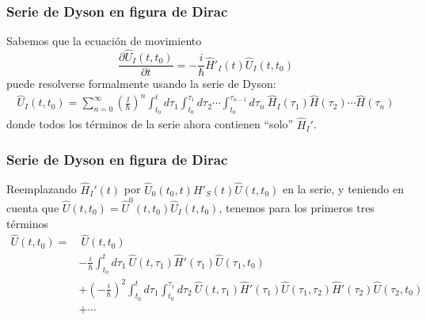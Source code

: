\documentclass{beamer}
\begin{document}
\begin{frame}
    \frametitle{Serie de Dyson en figura de Dirac}
    Sabemos que la ecuación de movimiento
    $$\frac{\partial \hat{U}_I(t,t_0)}{\partial t} = -\frac{i}{\hbar} \hat{H}'_I(t)\hat{U}_I(t,t_0)$$
    puede resolverse formalmente usando la serie de Dyson:
    \begin{align*} 
        \hat{U}_I(t,t_0)=
        \sum_{n=0}^\infty
        \left(\frac{\ii}{\hbar}\right)^n
        \int_{t_0}^{t}d\tau_{1}
        \int_{t_0}^{\tau_1}d\tau_2
        \cdots
        \int_{t_0}^{\tau_{n-1}}d\tau_n\
        \hat{H}_I(\tau_1)\hat{H}(\tau_2)\cdots\hat{H}(\tau_n) 
    \end{align*}
    donde todos los términos de la serie ahora contienen ``solo'' $\hat{H}_I'$.
\end{frame}

\begin{frame}
    \frametitle{Serie de Dyson en figura de Dirac}
    Reemplazando $\hat{H}_I'(t)$ por $\hat{U}_0(t_0,t)H'_S(t)\hat{U}(t,t_0)$ en la serie, y teniendo en cuenta que $\hat{U}(t,t_0) = \hat{U}^0(t,t_0)\hat{U}_I (t,t_0)$, tenemos para los primeros tres términos 
    \begin{align*}
        \hat{U}(t,t_0)  = &\ \hat{U}(t,t_0) \\
                       & -\frac{i}{\hbar} \int_{t_0}^{t} d\tau_1\ \hat{U}(t,\tau_1) \hat{H}'(\tau_1) \hat{U}(\tau_1,t_0) \\
                       & + \left( -\frac{i}{\hbar} \right)^2 
                       \int_{t_0}^{t} d\tau_1 \int_{t_0}^{\tau_1} d\tau_2 \ 
                       \hat{U}(t,\tau_1) \hat{H}'(\tau_1) \hat{U}(\tau_1,\tau_2) \hat{H}'(\tau_2) \hat{U}(\tau_2,t_0)\\
                       &+ \cdots
    \end{align*}
\end{frame}
\end{document}
